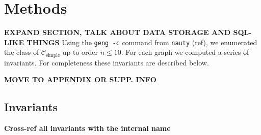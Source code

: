 \documentclass[12pt]{article}
\newcommand{\SIMPLECLASS}{\mathcal{C}_\text{simple}}
\begin{document}
\section{Methods}

\textbf{EXPAND SECTION, TALK ABOUT DATA STORAGE AND SQL-LIKE THINGS}
Using the \texttt{geng -c} command from \texttt{nauty} (ref), we enumerated the class of $\SIMPLECLASS$ up to order $n \le 10$.
For each graph we computed a series of invariants.
For completeness these invariants are described below.


\textbf{MOVE TO APPENDIX OR SUPP. INFO}

\subsection{Invariants}

\textbf{Cross-ref all invariants with the internal name}
\end{document}
